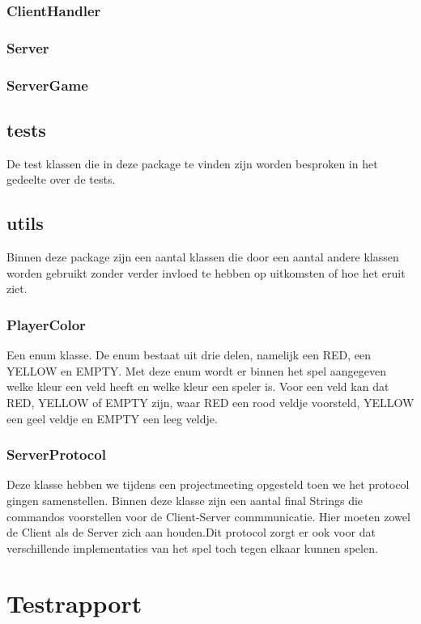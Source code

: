 \documentclass[12pt]{article}
\begin{document}
\subsubsection{ClientHandler}
\subsubsection{Server}
\subsubsection{ServerGame}

\subsection{tests}
De test klassen die in deze package te vinden zijn worden besproken in het gedeelte over de tests.

\subsection{utils}
Binnen deze package zijn een aantal klassen die door een aantal andere klassen worden gebruikt zonder verder invloed te hebben op uitkomsten of hoe het eruit ziet.
\subsubsection{PlayerColor}
Een enum klasse. De enum bestaat uit drie delen, namelijk een RED, een YELLOW en EMPTY. Met deze enum wordt er binnen het spel aangegeven welke kleur een veld heeft en welke kleur een speler is. Voor een veld kan dat RED, YELLOW of EMPTY zijn, waar RED een rood veldje voorsteld, YELLOW een geel veldje en EMPTY een leeg veldje.
\subsubsection{ServerProtocol}
Deze klasse hebben we tijdens een projectmeeting opgesteld toen we het protocol gingen samenstellen. Binnen deze klasse zijn een aantal final Strings die commandos voorstellen voor de Client-Server commmunicatie. Hier moeten zowel de Client als de Server zich aan houden.Dit protocol zorgt er ook voor dat verschillende implementaties van het spel toch tegen elkaar kunnen spelen.

\section{Testrapport}
\end{document}

